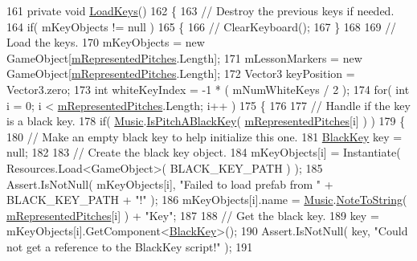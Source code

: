 \begin{DoxyCodeInclude}
161     \textcolor{keyword}{private} \textcolor{keywordtype}{void} \hyperlink{group___key_contain_priv_func_ga65f79700f265d2223681ac95981ab4a3}{LoadKeys}()
162     \{
163         \textcolor{comment}{// Destroy the previous keys if needed.}
164         \textcolor{keywordflow}{if}( mKeyObjects != null )
165         \{
166            \textcolor{comment}{// ClearKeyboard();}
167         \}
168 
169         \textcolor{comment}{// Load the keys.}
170         mKeyObjects = \textcolor{keyword}{new} GameObject[\hyperlink{group___key_contain_priv_var_ga103945a6efe3469191e5253d13fec5be}{mRepresentedPitches}.Length];
171         mLessonMarkers = \textcolor{keyword}{new} GameObject[\hyperlink{group___key_contain_priv_var_ga103945a6efe3469191e5253d13fec5be}{mRepresentedPitches}.Length];
172         Vector3 keyPosition = Vector3.zero;
173         \textcolor{keywordtype}{int} whiteKeyIndex = -1 * ( mNumWhiteKeys / 2 );
174         \textcolor{keywordflow}{for}( \textcolor{keywordtype}{int} i = 0; i < \hyperlink{group___key_contain_priv_var_ga103945a6efe3469191e5253d13fec5be}{mRepresentedPitches}.Length; i++ )
175         \{
176 
177             \textcolor{comment}{// Handle if the key is a black key.}
178             \textcolor{keywordflow}{if}( \hyperlink{class_music}{Music}.\hyperlink{group___music_stat_func_gacc2c1a66df7197225f61c5737f794065}{IsPitchABlackKey}( \hyperlink{group___key_contain_priv_var_ga103945a6efe3469191e5253d13fec5be}{mRepresentedPitches}[i] ) )
179             \{
180                 \textcolor{comment}{// Make an empty black key to help initialize this one.}
181                 \hyperlink{class_black_key}{BlackKey} key = null;
182 
183                 \textcolor{comment}{// Create the black key object.}
184                 mKeyObjects[i] = Instantiate( Resources.Load<GameObject>( BLACK\_KEY\_PATH ) );
185                 Assert.IsNotNull( mKeyObjects[i], \textcolor{stringliteral}{"Failed to load prefab from "} + BLACK\_KEY\_PATH + \textcolor{stringliteral}{"!"} );
186                 mKeyObjects[i].name = \hyperlink{class_music}{Music}.\hyperlink{group___music_stat_func_ga85a22c905d56d4c5f4e62159bfecee8c}{NoteToString}( 
      \hyperlink{group___key_contain_priv_var_ga103945a6efe3469191e5253d13fec5be}{mRepresentedPitches}[i] ) + \textcolor{stringliteral}{"Key"};
187 
188                 \textcolor{comment}{// Get the black key.}
189                 key = mKeyObjects[i].GetComponent<\hyperlink{class_black_key}{BlackKey}>();
190                 Assert.IsNotNull( key, \textcolor{stringliteral}{"Could not get a reference to the BlackKey script!"} );
191 

\end{DoxyCodeInclude}

